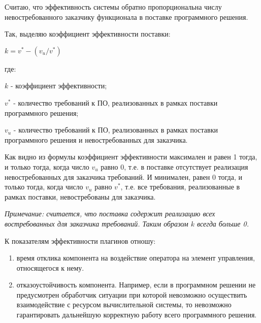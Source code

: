 
Считаю, что эффективность системы обратно пропорциональна числу невостребованного заказчику функционала в поставке программного решения.

Так, выделяю коэффициент эффективности поставки:

\begin{center}
    $k = v^* - (v_{u} / v^*)$
\end{center}

где:

$k$ - коэффициент эффективности;

$v^*$ - количество требований к ПО, реализованных в рамках поставки программного решения;

$v_u$ - количество требований к ПО, реализованных в рамках поставки программного решения и невостребованных для заказчика.

Как видно из формулы коэффициент эффективности максимален и равен 1 тогда, и только тогда, когда число $v_{u}$ равно 0, т.е. в поставке отсутствует реализация невостребованных для заказчика требований. И минимален, равен 0 тогда, и только тогда, когда число $v_{u}$ равно $v^*$, т.е. все требования, реализованные в рамках поставки, невостребованы для заказчика.

\textit{Примечание: считается, что поставка содержит реализацию всех востребованных для заказчика требований. Таким образом $k$ всегда больше 0.}

К показателям эффективности плагинов отношу:
\begin{enumerate}
    \item время отклика компонента на воздействие оператора на элемент управления, относящегося к нему.
    \item отказоустойчивость компонента. Например, если в программном решении не предусмотрен обработчик ситуации при которой невозможно осуществить взаимодействие с ресурсом вычислительной системы, то невозможно гарантировать дальнейшую корректную работу всего программного решения.
\end{enumerate}